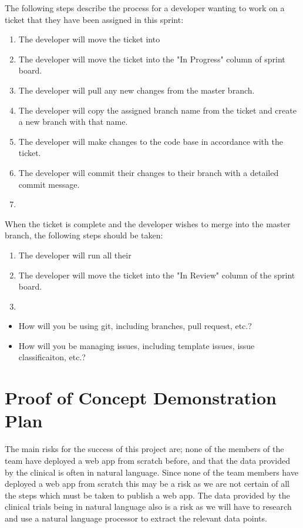 \documentclass{article}
\begin{document}
The following steps describe the process for a developer wanting to work on a ticket that they have been assigned in this sprint:
\begin{enumerate}
	\item The developer will move the ticket into
	\item The developer will move the ticket into the "In Progress" column of sprint board.
	\item The developer will pull any new changes from the master branch. 
	\item The developer will copy the assigned branch name from the ticket and create a new branch with that name.
	\item The developer will make changes to the code base in accordance with the ticket.
	\item The developer will commit their changes to their branch with a detailed commit message. 
	\item 
\end{enumerate}

When the ticket is complete and the developer wishes to merge into the master branch, the following steps should be taken:
\begin{enumerate}
	\item The developer will run all their
	\item The developer will move the ticket into the "In Review" column of the sprint board.
	\item 
\end{enumerate}

\begin{itemize}
	\item How will you be using git, including branches, pull request, etc.?
	\item How will you be managing issues, including template issues, issue
	classificaiton, etc.?
\end{itemize}

\section{Proof of Concept Demonstration Plan}

The main risks for the success of this project are; none of the members of the team have deployed a web app from scratch before, and that the data provided by the clinical is often in natural language. Since none of the team members have deployed a web app from scratch this may be a risk as we are not certain of all the steps which must be taken to publish a web app. The data provided by the clinical trials being in natural language also is a risk as we will have to research and use a natural language processor to extract the relevant data points. 
\end{document}
